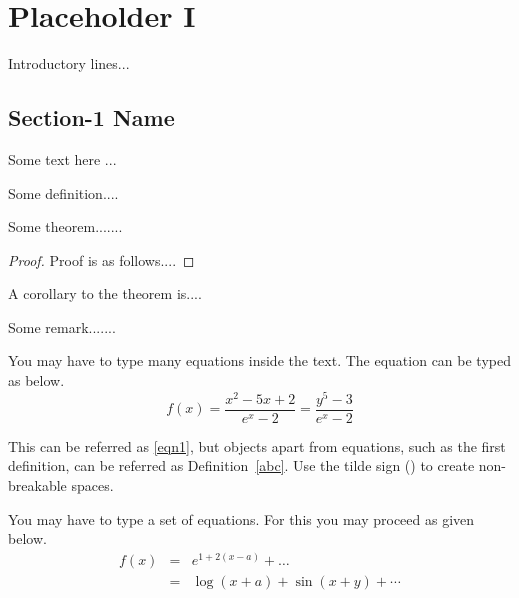 \chapter{Placeholder I}

Introductory lines...



\section{Section-1 Name}

Some text here ...

\begin{definition}\label{abc}
	Some definition....
\end{definition}

\begin{theorem}
	Some theorem.......
\end{theorem}

\begin{proof}
	Proof is as follows....
\end{proof}


\begin{corollary}
	A corollary to the theorem is....
\end{corollary}

\begin{remark}
	Some remark.......
\end{remark}


You may have to type many equations inside the text.  The equation can be typed as below.
\begin{equation}\label{eqn1}
	f(x) = \frac{x^2-5x+2}{e^x - 2} = \frac{y^5-3}{e^x-2} %
\end{equation}

This can be referred as \eqref{eqn1}, but objects apart from equations, such as the first definition, can be referred as Definition~\ref{abc}. Use the tilde sign (\texttildelow) to create non-breakable spaces.

You may have to type a set of equations.  For this you may proceed as given below.
\begin{eqnarray}
	f(x) &=& e^{1+2(x-a)} + \ldots   \nonumber   \\
	&=& \log(x+a) + \sin(x+y) + \cdots  \label{eqn2}
\end{eqnarray}


